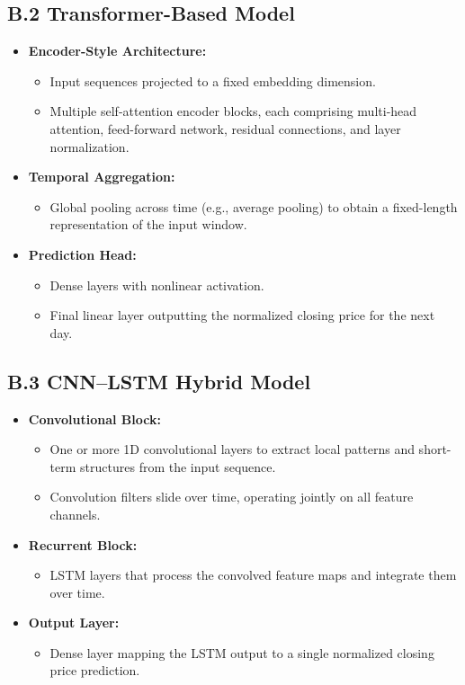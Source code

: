 \subsection*{B.2 Transformer-Based Model}

\begin{itemize}
    \item \textbf{Encoder-Style Architecture:}
    \begin{itemize}
        \item Input sequences projected to a fixed embedding dimension.
        \item Multiple self-attention encoder blocks, each comprising multi-head attention, feed-forward network, residual connections, and layer normalization.
    \end{itemize}
    \item \textbf{Temporal Aggregation:}
    \begin{itemize}
        \item Global pooling across time (e.g., average pooling) to obtain a fixed-length representation of the input window.
    \end{itemize}
    \item \textbf{Prediction Head:}
    \begin{itemize}
        \item Dense layers with nonlinear activation.
        \item Final linear layer outputting the normalized closing price for the next day.
    \end{itemize}
\end{itemize}

\subsection*{B.3 CNN--LSTM Hybrid Model}

\begin{itemize}
    \item \textbf{Convolutional Block:}
    \begin{itemize}
        \item One or more 1D convolutional layers to extract local patterns and short-term structures from the input sequence.
        \item Convolution filters slide over time, operating jointly on all feature channels.
    \end{itemize}
    \item \textbf{Recurrent Block:}
    \begin{itemize}
        \item LSTM layers that process the convolved feature maps and integrate them over time.
    \end{itemize}
    \item \textbf{Output Layer:}
    \begin{itemize}
        \item Dense layer mapping the LSTM output to a single normalized closing price prediction.
    \end{itemize}
\end{itemize}

